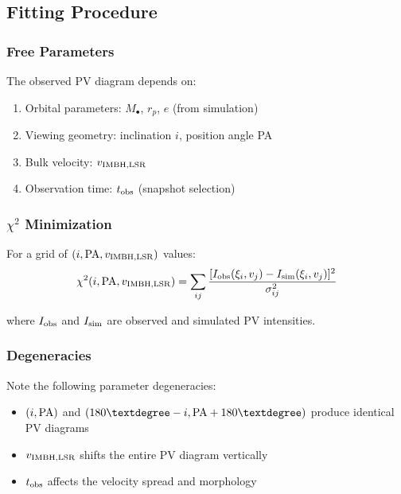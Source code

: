 \documentclass[twocolumn,amsmath,amssymb,prd,superscriptaddress,nofootinbib]{revtex4-2}
\begin{document}
\subsection{Fitting Procedure}
\label{sec:fitting}

\subsubsection{Free Parameters}

The observed PV diagram depends on:
\begin{enumerate}
    \item Orbital parameters: $M_\bullet$, $r_p$, $e$ (from simulation)
    \item Viewing geometry: inclination $i$, position angle PA
    \item Bulk velocity: $v_{\rm IMBH,LSR}$
    \item Observation time: $t_{\rm obs}$ (snapshot selection)
\end{enumerate}

\subsubsection{$\chi^2$ Minimization}

For a grid of $(i, {\rm PA}, v_{\rm IMBH,LSR})$ values:
\begin{equation}
    \chi^2(i, {\rm PA}, v_{\rm IMBH,LSR}) = \sum_{ij} \frac{[I_{\rm obs}(\xi_i, v_j) - I_{\rm sim}(\xi_i, v_j)]^2}{\sigma_{ij}^2}
    \label{eq:chi2}
\end{equation}

where $I_{\rm obs}$ and $I_{\rm sim}$ are observed and simulated PV intensities.

\subsubsection{Degeneracies}

Note the following parameter degeneracies:
\begin{itemize}
    \item $(i, {\rm PA})$ and $(180°-i, {\rm PA}+180°)$ produce identical PV diagrams
    \item $v_{\rm IMBH,LSR}$ shifts the entire PV diagram vertically
    \item $t_{\rm obs}$ affects the velocity spread and morphology
\end{itemize}
\end{document}
